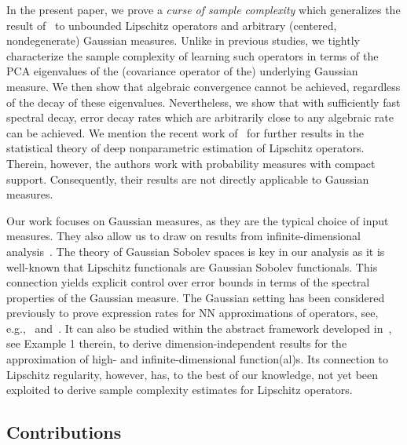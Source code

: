 \documentclass[namedate,webpdf]{ima-authoring-template-blank}
\numberwithin{counter}{section}
\numberwithin{equation}{section}
\theoremstyle{plain}
\theoremstyle{definition}
\theoremstyle{thmstyletwo}
\begin{document}
In the present paper, we prove a \emph{curse of sample complexity} which generalizes the result of~\citet{kovachki_DataComplexityEstimatesOperator_2024} to unbounded Lipschitz operators and arbitrary (centered, nondegenerate) Gaussian measures. Unlike in previous studies, we tightly characterize the sample complexity of learning such operators in terms of the PCA eigenvalues of the (covariance operator of the) underlying Gaussian measure. We then show that algebraic convergence cannot be achieved, regardless of the decay of these eigenvalues. Nevertheless, we show that with sufficiently fast spectral decay, error decay rates which are arbitrarily close to any algebraic rate can be achieved.
We mention the recent work of~\citet{liu_DeepNonparametricEstimationOperators_2024} for further results in the statistical theory of deep nonparametric estimation of Lipschitz operators. Therein, however, the authors work with probability measures with compact support. Consequently, their results are not directly applicable to Gaussian measures.

Our work focuses on Gaussian measures, as they are the typical choice of input measures. They also allow us to draw on results from infinite-dimensional analysis~\citep{bogachev_GaussianMeasures_1998, daprato_IntroductionInfiniteDimensionalAnalysis_2006,daprato_IntroductionStochasticAnalysisMalliavin_2014, lunardi_InfiniteDimensionalAnalysis_2015}. The theory of Gaussian Sobolev spaces is key in our analysis as it is well-known that Lipschitz functionals are Gaussian Sobolev functionals. This connection yields explicit control over error bounds in terms of the spectral properties of the Gaussian measure.
The Gaussian setting has been considered previously to prove expression rates for NN approximations of operators, see, e.g.,~\citet{schwab_DeepLearningHighDimension_2023} and~\citet{dung_DeepReLUNeuralNetwork_2023}. It can also be studied within the abstract framework developed in~\citet{griebel_StableSplittingsHilbertSpaces_2017}, see Example 1 therein, to derive dimension-independent results for the approximation of high- and infinite-dimensional function(al)s. Its connection to Lipschitz regularity, however, has, to the best of our knowledge, not yet been exploited to derive sample complexity estimates for Lipschitz operators.



\subsection{Contributions}
\label{subsec: contributions}
\end{document}
